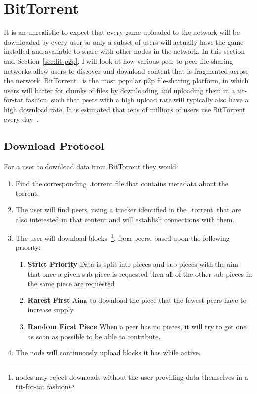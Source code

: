 
\section{BitTorrent}
\label{sec:bittorrent}

It is an unrealistic to expect that every game uploaded to the network will be downloaded by every user so only a subset of users will actually have the game installed and available to share with other nodes in the network. 
In this section and Section~\ref{sec:lit-p2p}, I will look at how various peer-to-peer file-sharing networks allow users to discover and download content that is fragmented across the network. 
\x
BitTorrent~\cite{kaune_unraveling_2010,pouwelse_bittorrent_2005} is the most popular p2p file-sharing platform, in which users will barter for chunks of files by downloading and uploading them in a tit-for-tat fashion, such that peers with a high upload rate will typically also have a high download rate.
It is estimated that tens of millions of users use BitTorrent every day~\cite{wang_measuring_2013}.

\subsection*{Download Protocol}
\label{subsec:bittorrent-download}

For a user to download data from BitTorrent they would:

\begin{enumerate}
  \item Find the corresponding~.torrent file that contains metadata about the torrent.
  \item The user will find peers, using a tracker identified in the~.torrent, that are also interested in that content and will establish connections with them.
  \item The user will download blocks~\footnote{nodes may reject downloads without the user providing data themselves in a tit-for-tat fashion}, from peers, based upon the following priority:
        \begin{enumerate}
          \item \textbf{Strict Priority} Data is split into pieces and sub-pieces with the aim that once a given sub-piece is requested then all of the other sub-pieces in the same piece are requested
          \item \textbf{Rarest First} Aims to download the piece that the fewest peers have to increase supply.
          \item \textbf{Random First Piece} When a peer has no pieces, it will try to get one as soon as possible to be able to contribute.
        \end{enumerate}
  \item The node will continuously upload blocks it has while active.
\end{enumerate}

